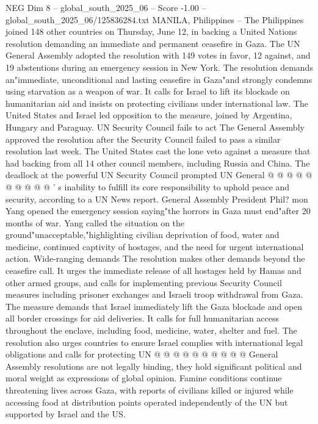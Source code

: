 \begin{textsample}{NEG Dim 8 – global\_south\_2025\_06 – Score -1.00 – global\_south\_2025\_06/125836284.txt}  \label{ex:f8_neg_249}
MANILA, Philippines -- The Philippines joined 148 other countries on Thursday, June 12, in backing a United Nations resolution demanding an immediate and permanent ceasefire in Gaza.
The UN General Assembly adopted the resolution with 149 votes in favor, 12 against, and 19 abstentions during an emergency session in New York.
The resolution demands an"immediate, unconditional and lasting ceasefire in Gaza"and strongly condemns using starvation as a weapon of war.
It calls for Israel to lift its blockade on humanitarian aid and insists on protecting civilians under international law.
The United States and Israel led opposition to the measure, joined by Argentina, Hungary and Paraguay.
UN Security Council fails to act The General Assembly approved the resolution after the Security Council failed to pass a similar resolution last week.
The United States cast the lone veto against a measure that had backing from all 14 other council members, including Russia and China.
The deadlock at the powerful UN Security Council prompted UN General @ @ @ @ @ @ @ @ @ @ ' s inability to fulfill its core responsibility to uphold peace and security, according to a UN News report.
General Assembly President Phil? mon Yang opened the emergency session saying"the horrors in Gaza must end"after 20 months of war.
Yang called the situation on the ground"unacceptable,"highlighting civilian deprivation of food, water and medicine, continued captivity of hostages, and the need for urgent international action.
Wide-ranging demands The resolution makes other demands beyond the ceasefire call.
It urges the immediate release of all hostages held by Hamas and other armed groups, and calls for implementing previous Security Council measures including prisoner exchanges and Israeli troop withdrawal from Gaza.
The measure demands that Israel immediately lift the Gaza blockade and open all border crossings for aid deliveries.
It calls for full humanitarian access throughout the enclave, including food, medicine, water, shelter and fuel.
The resolution also urges countries to ensure Israel complies with international legal obligations and calls for protecting UN @ @ @ @ @ @ @ @ @ @ General Assembly resolutions are not legally binding, they hold significant political and moral weight as expressions of global opinion.
Famine conditions continue threatening lives across Gaza, with reports of civilians killed or injured while accessing food at distribution points operated independently of the UN but supported by Israel and the US.

\end{textsample}

